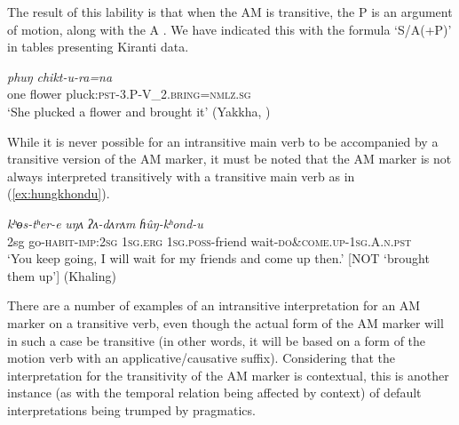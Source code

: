 \documentclass[oneside,a4paper,11pt]{article}
\newcommand{\ipa}[1]{{\phon\textit{#1}}}
\newcommand{\sens}[1]{‘#1’}
\newcommand{\rouge}[1]{{\color{red}#1}}
\begin{document}
The result of this lability is that when the AM is transitive, the P is an argument of motion, along with the A .
We have indicated this with the formula `S/A(+P)' in tables presenting Kiranti data.
 
\begin{exe}
\ex \label{ex:chikturana}
 \gll  \ipa{eko}	\ipa{phuŋ}	\ipa{chikt-u-\rouge{ra}=na} \\
one flower pluck:\textsc{pst}-3.P-\rouge{V_2.\textsc{bring}}=\textsc{nmlz.sg} \\
\glt \sens{She plucked a flower and brought it} (Yakkha, \citealt[312]{schackow15yakkha})
\end{exe}

While it is never possible for an intransitive main verb to be accompanied by a transitive version of the AM marker, it must be noted that the AM marker is not always interpreted transitively with a transitive main verb as in (\ref{ex:hungkhondu}). 

\begin{exe}  
\ex \label{ex:hungkhondu}
 \gll  \ipa{ʔīn} \ipa{kʰɵs-tʰer-e} \ipa{uŋʌ} \ipa{ʔʌ-dʌrʌm} \ipa{ɦûŋ-\rouge{kʰond}-u} \\
 2sg go-\textsc{habit}-\textsc{imp}:\textsc{2sg} \textsc{1sg}.\textsc{erg} \textsc{1sg}.\textsc{poss}-friend wait-\rouge{\textsc{do\&come.up}}-\textsc{1sg.A.n.pst} \\
\glt `You keep going, I will wait for my friends and come up then.' [NOT `brought them up'] (Khaling)
\end{exe}

 There are a number of examples of an intransitive interpretation for an AM marker on a transitive verb, even though the actual form of the AM marker will in such a case be transitive (in other words, it will be based on a form of the motion verb with an applicative/causative suffix).  Considering that the interpretation for the transitivity of the AM marker is contextual, this is another instance (as with the temporal relation being affected by context) of default interpretations being trumped by pragmatics.
  
\end{document}
